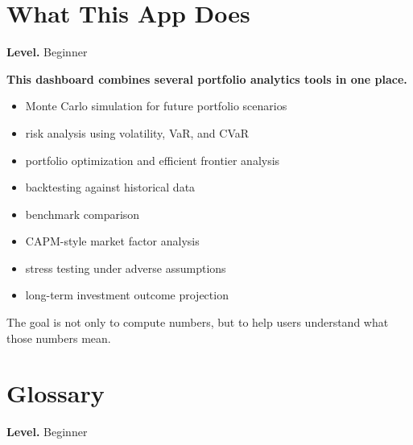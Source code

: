 \documentclass[11pt]{report}
\begin{document}
\section{What This App Does}
\begin{callout}
\textbf{Level.} Beginner
\end{callout}

\textbf{This dashboard combines several portfolio analytics tools in one place.}

\begin{itemize}
\item Monte Carlo simulation for future portfolio scenarios
\item risk analysis using volatility, VaR, and CVaR
\item portfolio optimization and efficient frontier analysis
\item backtesting against historical data
\item benchmark comparison
\item CAPM-style market factor analysis
\item stress testing under adverse assumptions
\item long-term investment outcome projection
\end{itemize}

The goal is not only to compute numbers, but to help users understand what those numbers mean.

\section{Glossary}
\begin{callout}
\textbf{Level.} Beginner
\end{callout}
\end{document}
